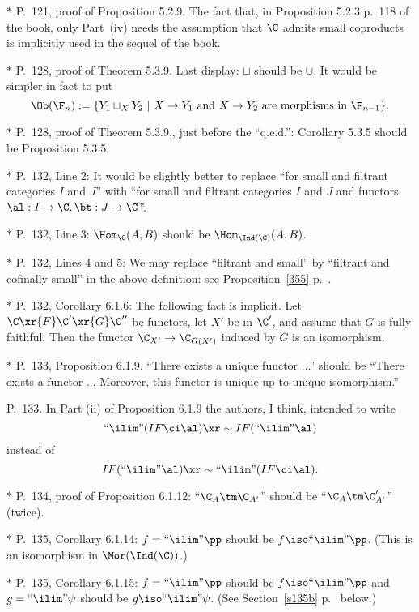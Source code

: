 \documentclass[12pt]{article}
\theoremstyle{remark}
\theoremstyle{definition}
\begin{document}
\nn$*$ P.~121, proof of Proposition 5.2.9. The fact that, in Proposition 5.2.3 p.~118 of the book, only Part~(iv) needs the assumption that $\C$ admits small coproducts is implicitly used in the sequel of the book.

\nn$*$ P.~128, proof of Theorem 5.3.9. Last display: $\sqcup$ should be $\cup$. It would be simpler in fact to put 
$$
\Ob(\F_n):=\{Y_1\sqcup_XY_2\ |\ X\to Y_1\text{ and }X\to Y_2\text{ are morphisms in }\F_{n-1}\}.
$$ 

\nn$*$ P.~128, proof of Theorem 5.3.9,, just before the ``q.e.d.'': Corollary 5.3.5 should be Proposition 5.3.5.

\nn$*$ P.~132, Line 2: It would be slightly better to replace ``for small and filtrant categories $I$ and $J$'' with ``for small and filtrant categories $I$ and $J$ and functors $\al:I\to\C,\bt:J\to\C$''.

\nn$*$ P.~132, Line 3: $\Hom_\C(A,B)$ should be $\Hom_{\Ind(\C)}(A,B)$.

\nn$*$ P.~132, Lines 4 and 5: \guillemotleft We may replace ``filtrant and small'' by ``filtrant and cofinally small'' in the above definition\guillemotright: see Proposition~\ref{355} p.~.

\nn$*$ P.~132, Corollary 6.1.6: The following fact is implicit. Let $\C\xr{F}\C'\xr{G}\C''$ be functors, let $X'$ be in $\C'$, and assume that $G$ is fully faithful. Then the functor $\C_{X'}\to\C_{G(X')}$ induced by $G$ is an isomorphism.

\nn$*$ P.~133, Proposition 6.1.9. ``There exists a unique functor ...'' should be ``There exists a functor ... Moreover, this functor is unique up to unique isomorphism.''

\begin{s} 
P.~133. In Part (ii) of Proposition 6.1.9 the authors, I think, intended to write 
$$
``\ilim"(IF\ci\al)\xr\sim IF(``\ilim"\al)
$$
instead of 
$$
IF(``\ilim"\al)\xr\sim``\ilim"(IF\ci\al). 
$$ 
\end{s}

\nn$*$ P.~134, proof of Proposition 6.1.12: ``$\C_A\tm\C_{A'}$'' should be ``$\C_A\tm\C'_{A'}$'' (twice).

\nn$*$ P.~135, Corollary 6.1.14: $f=``\ilim"\pp$ should be $f\iso``\ilim"\pp$. (This is an isomorphism in $\Mor(\Ind(\C))$.)

\begin{s}
$*$ P.~135, Corollary 6.1.15: $f=``\ilim"\pp$ should be $f\iso``\ilim"\pp$ and $g=``\ilim"\psi$ should be $g\iso``\ilim"\psi$. (See Section~\ref{s135b} p.~ below.)
\end{s}
\end{document}
